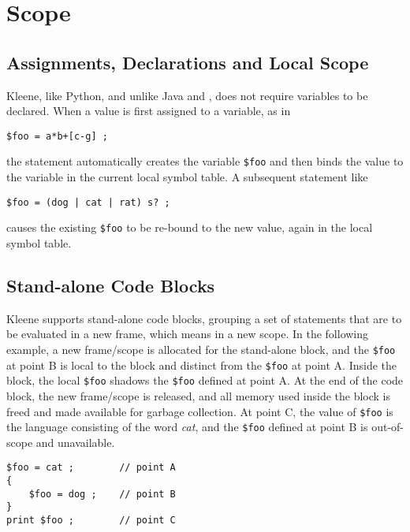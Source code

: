 \section{Scope}

\subsection{Assignments, Declarations and Local Scope}

Kleene, like Python, and unlike Java and \CPP{}, does not require
variables to be declared.
When a value is first assigned to a variable, as in

\begin{Verbatim}
$foo = a*b+[c-g] ;
\end{Verbatim}

\noindent
the statement automatically creates the variable \verb!$foo! and then binds
the \fsm{} value to the variable in the current local symbol table.  A
subsequent statement like

\begin{Verbatim}
$foo = (dog | cat | rat) s? ;
\end{Verbatim}

\noindent
causes the existing \verb!$foo! to be re-bound to the new \fsm{} 
value, again in the local symbol table.


\subsection{Stand-alone Code Blocks}

Kleene supports stand-alone code blocks, grouping a set of statements
that are to be evaluated in a new frame, which means in a new scope.
In the following example, a new frame/scope is allocated for the
stand-alone block, and the \verb!$foo! at point B is local to the block
and distinct from the
\verb!$foo! at point A. Inside the block, the local \verb!$foo! shadows
the \verb!$foo! defined at point A.  At the end of the code block, the new
frame/scope is released, and all memory used inside the block is freed
and made available for garbage collection.  At point C, the value of \verb!$foo! is the
language consisting of the word \emph{cat}, and the \verb!$foo! defined
at point B is out-of-scope and unavailable.

\begin{Verbatim}
$foo = cat ;        // point A
{
    $foo = dog ;    // point B
}
print $foo ;        // point C
\end{Verbatim}

